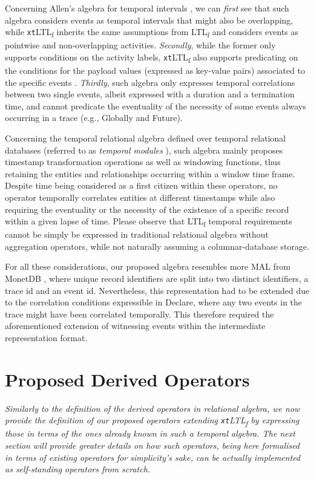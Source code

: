 \documentclass[sigconf]{acmart}
\begin{document}
Concerning Allen's algebra for temporal intervals \cite{10.1145/182.358434}, we can \textit{first} see that such algebra considers events as temporal intervals that might also be overlapping, while \texttt{xt}LTL\textsubscript{f} inherits the same assumptions from LTL\textsubscript{f} and considers events as pointwise and non-overlapping activities. \textit{Secondly}, while the former only supports conditions on the activity labels, \texttt{xt}LTL\textsubscript{f} also supports predicating on the conditions for the payload values (expressed as key-value pairs) associated to the specific events \cite{info14030173}. \textit{Thirdly}, such algebra only expresses temporal correlations between two single events, albeit expressed with a duration and a termination time, and cannot predicate the eventuality of the necessity of some events always occurring in a trace (e.g., Globally and Future). 

Concerning the temporal relational algebra \cite{DBLP:conf/cikm/Wang95} defined over temporal relational databases (referred to as \textit{temporal modules} \cite{DBLP:journals/isci/WangJS95}),  such algebra mainly proposes timestamp transformation operations as well as windowing functions, thus retaining the entities and relationships occurring within a window time frame. Despite time being considered as a first citizen within these operators, no operator temporally correlates entities at different timestamps while also requiring the eventuality or the necessity of the existence of a specific record within a given lapse of time. Please observe that LTL\textsubscript{f} temporal requirements cannot be simply be expressed in traditional relational algebra without aggregation operators, while not naturally assuming a columnar-database storage.

For all these considerations, our proposed algebra resembles more MAL from MonetDB \cite{IdreosGNMMK12}, where unique record identifiers are split into two distinct identifiers, a trace id and an event id. Nevertheless, this representation had to be extended due to the correlation conditions expressible in Declare, where any two events in the trace might have been correlated temporally. This therefore required the aforementioned extension of witnessing events within the intermediate representation format.



\section{Proposed Derived Operators}\label{sec:opdef}
\textit{Similarly to the definition of the derived operators in relational algebra, we now provide the definition of our proposed operators extending \texttt{xt}LTL\textsubscript{f} by expressing those in terms of the ones already known in such a temporal algebra. The next section will provide greater details on how such operators, being here formalised in terms of existing operators for simplicity's sake, can be actually implemented as self-standing operators from scratch.}
\medskip
\end{document}
